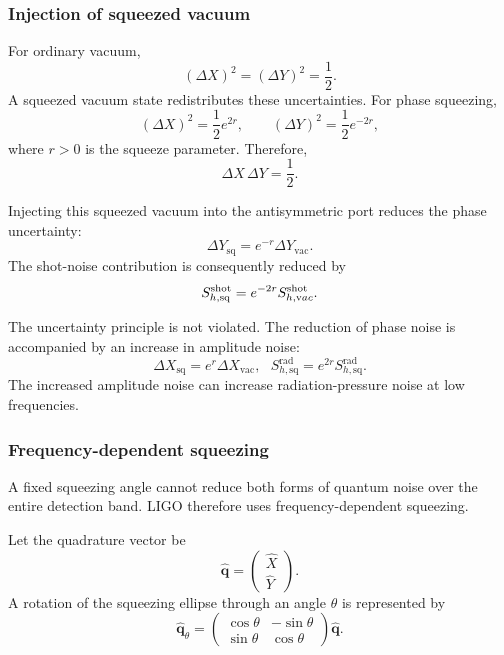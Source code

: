 \subsubsection{Injection of squeezed vacuum}

For ordinary vacuum,
\begin{equation}
    (\Delta X)^2=(\Delta Y)^2=\frac12.
\end{equation}
A squeezed vacuum state redistributes these uncertainties. For phase
squeezing,
\begin{equation}
    (\Delta X)^2=\frac12e^{2r},
    \qquad
    (\Delta Y)^2=\frac12e^{-2r},
\end{equation}
where \(r>0\) is the squeeze parameter. Therefore,
\begin{equation}
    \Delta X\,\Delta Y=\frac12.
\end{equation}

Injecting this squeezed vacuum into the antisymmetric port reduces the phase
uncertainty:
\begin{equation}
    \Delta Y_{\text{sq}}=e^{-r}\Delta Y_{\text{vac}}.
\end{equation}
The shot-noise contribution is consequently reduced by
\begin{equation}
    S_{h,\text{sq}}^{\text{shot}}
    =e^{-2r}S_{h,\text vac}^{\text{shot}}.
\end{equation}

The uncertainty principle is not violated. The reduction of phase noise is
accompanied by an increase in amplitude noise:
\begin{equation}
    \Delta X_{\text{sq}}=e^r\Delta X_{\text{vac}},~~~S_{h,\text{sq}}^{\text{rad}}=e^{2r}S_{h,\text{sq}}^{\text{rad}}.
\end{equation}
The increased amplitude noise can increase radiation-pressure noise at low
frequencies.

\subsubsection{Frequency-dependent squeezing}

A fixed squeezing angle cannot reduce both forms of quantum noise over the
entire detection band. LIGO therefore uses frequency-dependent squeezing.

Let the quadrature vector be
\begin{equation}
    \hat{\bm q}
    =
    \begin{pmatrix}
        \hat X\\
        \hat Y
    \end{pmatrix}.
\end{equation}
A rotation of the squeezing ellipse through an angle \(\theta\) is represented
by
\begin{equation}
    \hat{\bm q}_\theta
    =
    \begin{pmatrix}
        \cos\theta & -\sin\theta\\
        \sin\theta & \cos\theta
    \end{pmatrix}
    \hat{\bm q}.
\end{equation}

